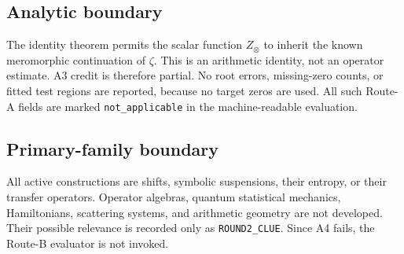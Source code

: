 \subsection{Analytic boundary}

The identity theorem permits the scalar function $Z_\otimes$ to inherit the
known meromorphic continuation of $\zeta$.  This is an arithmetic identity,
not an operator estimate.  A3 credit is therefore partial.  No root errors,
missing-zero counts, or fitted test regions are reported, because no target
zeros are used.  All such Route-A fields are marked
\texttt{not\_applicable} in the machine-readable evaluation.

\subsection{Primary-family boundary}

All active constructions are shifts, symbolic suspensions, their entropy,
or their transfer operators.  Operator algebras, quantum statistical
mechanics, Hamiltonians, scattering systems, and arithmetic geometry are not
developed.  Their possible relevance is recorded only as
\texttt{ROUND2\_CLUE}.  Since A4 fails, the Route-B evaluator is not invoked.
